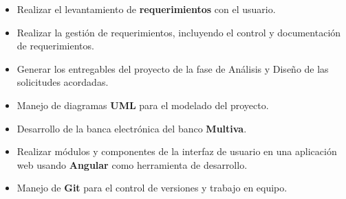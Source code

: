 \documentclass[letterpaper]{twentysecondcv} %
\begin{document}


\begin{itemize}
	\item Realizar el levantamiento de \textbf{requerimientos} con el usuario.
	\item Realizar la gestión de requerimientos, incluyendo el control y documentación de requerimientos.
	\item Generar los entregables del proyecto de la fase de Análisis y Diseño de las solicitudes acordadas.
	\item Manejo de diagramas \textbf{UML} para el modelado del proyecto.
\end{itemize}

\divider

\begin{itemize}
	\item Desarrollo de la banca electrónica del banco \textbf{Multiva}.
	\item Realizar módulos y componentes de la interfaz de usuario en una aplicación web usando \textbf{Angular} como herramienta de desarrollo.
	\item Manejo de \textbf{Git} para el control de versiones y trabajo en equipo.
\end{itemize}






\end{document}
